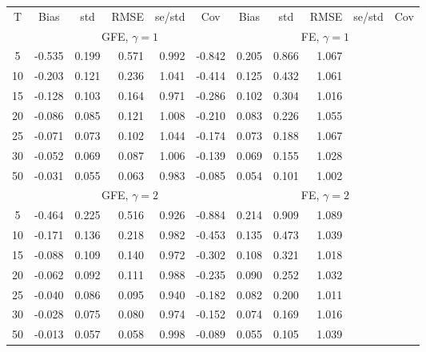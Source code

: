 \documentclass[preview]{standalone}
\begin{document}
 
\begin{tabular}{c r r r r r r r r r r} 
\toprule 
T & \multicolumn{1}{c}{ Bias } & \multicolumn{1}{c}{ std } & \multicolumn{1}{c}{ RMSE } & \multicolumn{1}{c}{ se/std } & \multicolumn{1}{c}{ Cov } & \multicolumn{1}{c}{ Bias } & \multicolumn{1}{c}{ std } & \multicolumn{1}{c}{ RMSE } & \multicolumn{1}{c}{ se/std } & \multicolumn{1}{c}{ Cov }\\[2pt]
 & \multicolumn{ 5 }{c}{ GFE, $\gamma=1$} & \multicolumn{ 5 }{c}{ FE, $\gamma=1$}\\[-3pt]
 \cmidrule(lr){2-6}  \cmidrule(lr){7-11}
5 &     -0.535 &      0.199 &      0.571 &      0.992 &     -0.842 &      0.205 &      0.866 &      1.067\\
10 &     -0.203 &      0.121 &      0.236 &      1.041 &     -0.414 &      0.125 &      0.432 &      1.061\\
15 &     -0.128 &      0.103 &      0.164 &      0.971 &     -0.286 &      0.102 &      0.304 &      1.016\\
20 &     -0.086 &      0.085 &      0.121 &      1.008 &     -0.210 &      0.083 &      0.226 &      1.055\\
25 &     -0.071 &      0.073 &      0.102 &      1.044 &     -0.174 &      0.073 &      0.188 &      1.067\\
30 &     -0.052 &      0.069 &      0.087 &      1.006 &     -0.139 &      0.069 &      0.155 &      1.028\\
50 &     -0.031 &      0.055 &      0.063 &      0.983 &     -0.085 &      0.054 &      0.101 &      1.002\\[0pt]
 & \multicolumn{ 5 }{c}{ GFE, $\gamma=2$} & \multicolumn{ 5 }{c}{ FE, $\gamma=2$}\\[-3pt]
 \cmidrule(lr){2-6}  \cmidrule(lr){7-11}
5 &     -0.464 &      0.225 &      0.516 &      0.926 &     -0.884 &      0.214 &      0.909 &      1.089\\
10 &     -0.171 &      0.136 &      0.218 &      0.982 &     -0.453 &      0.135 &      0.473 &      1.039\\
15 &     -0.088 &      0.109 &      0.140 &      0.972 &     -0.302 &      0.108 &      0.321 &      1.018\\
20 &     -0.062 &      0.092 &      0.111 &      0.988 &     -0.235 &      0.090 &      0.252 &      1.032\\
25 &     -0.040 &      0.086 &      0.095 &      0.940 &     -0.182 &      0.082 &      0.200 &      1.011\\
30 &     -0.028 &      0.075 &      0.080 &      0.974 &     -0.152 &      0.074 &      0.169 &      1.016\\
50 &     -0.013 &      0.057 &      0.058 &      0.998 &     -0.089 &      0.055 &      0.105 &      1.039\\[0pt]
\bottomrule 
\end{tabular}
\end{document}
